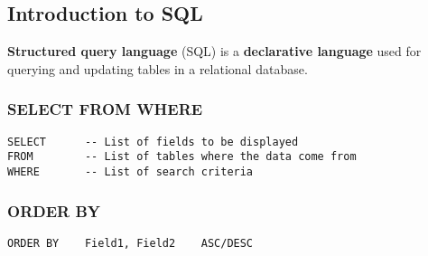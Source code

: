 \subsection{Introduction to SQL}

\textbf{Structured query language} (SQL) is a \textbf{declarative language} used for querying and updating tables in a relational database.

\subsubsection*{SELECT FROM WHERE}
\begin{verbatim}
SELECT      -- List of fields to be displayed
FROM        -- List of tables where the data come from
WHERE       -- List of search criteria
\end{verbatim}

\subsubsection*{ORDER BY}
\begin{verbatim}
ORDER BY    Field1, Field2    ASC/DESC
\end{verbatim}
